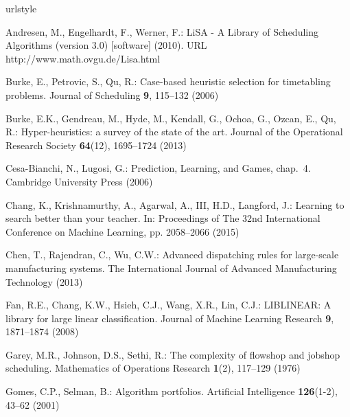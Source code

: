 \documentclass[twocolumn]{svjour3}
\begin{document}
\begin{thebibliography}{10}
    \providecommand{\url}[1]{{#1}}
    \providecommand{\urlprefix}{URL }
    \expandafter\ifx\csname urlstyle\endcsname\relax
    \providecommand{\doi}[1]{DOI~\discretionary{}{}{}#1}\else
    \providecommand{\doi}{DOI~\discretionary{}{}{}\begingroup
        \urlstyle{rm}\Url}\fi
    
    Andresen, M., Engelhardt, F., Werner, F.: {LiSA - A Library of Scheduling
        Algorithms} (version 3.0) [software] (2010).
    \newblock \urlprefix\url{http://www.math.ovgu.de/Lisa.html}
    
    Burke, E., Petrovic, S., Qu, R.: Case-based heuristic selection for 
    timetabling
    problems.
    \newblock Journal of Scheduling \textbf{9}, 115--132 (2006)
    
    Burke, E.K., Gendreau, M., Hyde, M., Kendall, G., Ochoa, G., Ozcan, E., Qu, 
    R.:
    Hyper-heuristics: a survey of the state of the art.
    \newblock Journal of the Operational Research Society \textbf{64}(12),
    1695--1724 (2013)
    
    Cesa-Bianchi, N., Lugosi, G.: Prediction, Learning, and Games, chap.~4.
    \newblock Cambridge University Press (2006)
    
    Chang, K., Krishnamurthy, A., Agarwal, A., III, H.D., Langford, J.: 
    Learning to
    search better than your teacher.
    \newblock In: Proceedings of The 32nd International Conference on Machine
    Learning, pp. 2058--2066 (2015)
    
    Chen, T., Rajendran, C., Wu, C.W.: {Advanced dispatching rules for 
    large-scale
        manufacturing systems}.
    \newblock The International Journal of Advanced Manufacturing Technology
    (2013)
    
    Fan, R.E., Chang, K.W., Hsieh, C.J., Wang, X.R., Lin, C.J.: {LIBLINEAR}: A
    library for large linear classification.
    \newblock Journal of Machine Learning Research \textbf{9}, 1871--1874 (2008)
    
    Garey, M.R., Johnson, D.S., Sethi, R.: The complexity of flowshop and 
    jobshop
    scheduling.
    \newblock Mathematics of Operations Research \textbf{1}(2), 117--129 (1976)
    
    Gomes, C.P., Selman, B.: {Algorithm portfolios}.
    \newblock Artificial Intelligence \textbf{126}(1-2), 43--62 (2001)
    

\end{thebibliography}
\end{document}
